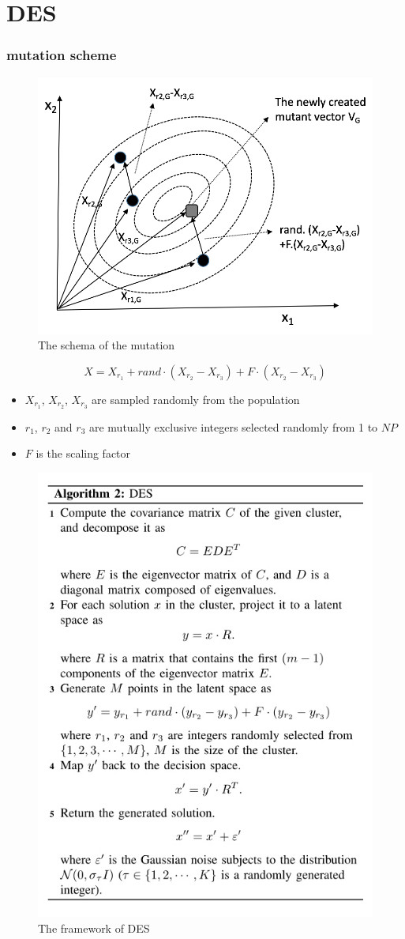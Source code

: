 \documentclass[xcolor=dvipsnames]{beamer}
\begin{document}
    \section{DES}
    \begin{frame}
    \frametitle{mutation scheme}
    \begin{figure}
    \centering
    \includegraphics[width=0.3\columnwidth]{mutation1.png}
    \caption{The schema of the mutation}
    \end{figure}
    \begin{equation}
    \label{DE}
    X=X_{r_1}+rand\cdot(X_{r_2}-X_{r_3})+F\cdot(X_{r_2}-X_{r_3})
    \end{equation}

    \begin{itemize}
    \item $X_{r_1}$, $X_{r_2}$, $X_{r_3}$ are sampled randomly from the population
    \item $r_1$, $r_2$ and $r_3$ are mutually exclusive integers selected randomly from 1 to $NP$
    \item $F$ is the scaling factor
    \end{itemize}
    \end{frame}
    \begin{figure}
    \centering
    \includegraphics[width=0.5\columnwidth]{alg2.jpg}
    \caption{The framework of DES}
    \end{figure}
\end{document}
